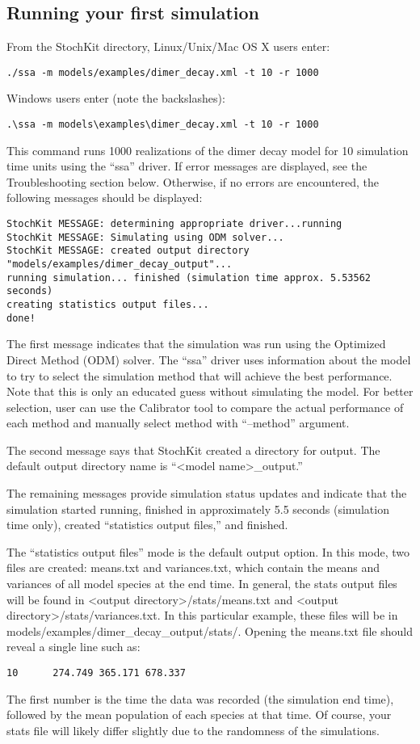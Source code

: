 \documentclass[11pt,letterpaper]{article}
\begin{document}
\subsection{Running your first simulation}

From the StochKit directory, Linux/Unix/Mac OS X users enter:
\begin{lstlisting}
./ssa -m models/examples/dimer_decay.xml -t 10 -r 1000
\end{lstlisting}
Windows users enter (note the backslashes):
\begin{lstlisting}
.\ssa -m models\examples\dimer_decay.xml -t 10 -r 1000
\end{lstlisting}

This command runs 1000 realizations of the dimer decay model for 10 simulation time units using the ``ssa'' driver.  If error messages are displayed, see the Troubleshooting section below.  Otherwise, if no errors are encountered, the following messages should be displayed:
\begin{lstlisting}
StochKit MESSAGE: determining appropriate driver...running
StochKit MESSAGE: Simulating using ODM solver...
StochKit MESSAGE: created output directory 
"models/examples/dimer_decay_output"...
running simulation... finished (simulation time approx. 5.53562 seconds)
creating statistics output files...
done!
\end{lstlisting}

The first message indicates that the simulation was run using the Optimized Direct Method (ODM) solver.  The ``ssa'' driver uses information about the model to try to select the simulation method that will achieve the best performance. Note that this is only an educated guess without simulating the model. For better selection, user can use the Calibrator tool to compare the actual performance of each method and manually select method with ``--method'' argument.

The second message says that StochKit created a directory for output.  The default output directory name is ``<model name>\_output.''

The remaining messages provide simulation status updates and indicate that the simulation started running, finished in approximately 5.5 seconds (simulation time only), created ``statistics output files,'' and finished.  

The ``statistics output files'' mode is the default output option.  In this mode, two files are created: means.txt and variances.txt, which contain the means and variances of all model species at the end time.  In general, the stats output files will be found in <output directory>/stats/means.txt and <output directory>/stats/variances.txt.  In this particular example, these files will be in models/examples/dimer\_decay\_output/stats/.  Opening the means.txt file should reveal a single line such as:
\begin{lstlisting}
10      274.749 365.171 678.337
\end{lstlisting}
The first number is the time the data was recorded (the simulation end time), followed by the mean population of each species at that time.  Of course, your stats file will likely differ slightly due to the randomness of the simulations.
\end{document}
